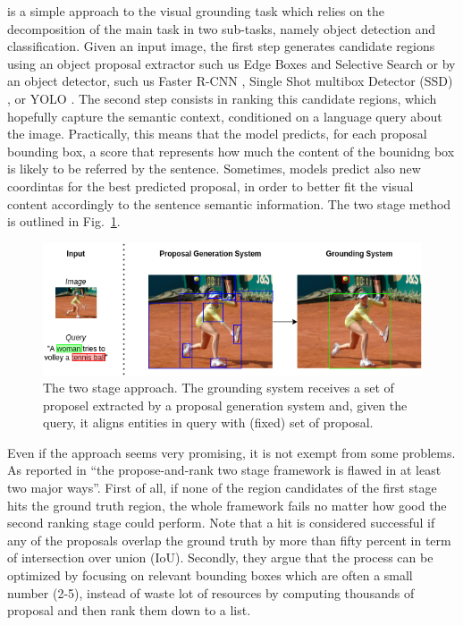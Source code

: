  is a simple approach to the visual
grounding task which relies on the decomposition of the main task in
two sub-tasks, namely object detection and classification. Given an
input image, the first step generates candidate regions using an
object proposal extractor such us Edge Boxes \cite{zitnick2014edge}
and Selective Search \cite{uijlings2013selective} or by an object
detector, such us Faster R-CNN \cite{girshick2014rich}, Single Shot
multibox Detector (SSD) \cite{liu2016ssd}, or YOLO
\cite{redmon2016you}. The second step consists in ranking this
candidate regions, which hopefully capture the semantic context,
conditioned on a language query about the image. Practically, this
means that the model predicts, for each proposal bounding box, a score
that represents how much the content of the bounidng box is likely to
be referred by the sentence. Sometimes, models predict also new
coordintas for the best predicted proposal, in order to better fit the
visual content accordingly to the sentence semantic information. The
two stage method is outlined in Fig.~\ref{fig:two-stage-approach}.

\begin{figure}
  \centering
  \includegraphics[width=.8\textwidth]{figures/two-stage-approach.png}
  \caption[Two stage approach]{
    The two stage approach. The grounding system receives a set of
    proposel extracted by a proposal generation system and, given the
    query, it aligns entities in query with (fixed) set of proposal.
  }
  \label{fig:two-stage-approach}
\end{figure}

Even if the approach seems very promising, it is not exempt from some
problems. As reported in \cite{yang2019fast} ``the propose-and-rank
two stage framework is flawed in at least two major ways''. First of
all, if none of the region candidates of the first stage hits the
ground truth region, the whole framework fails no matter how good the
second ranking stage could perform. Note that a hit is considered
successful if any of the proposals overlap the ground truth by more
than fifty percent in term of intersection over union (IoU). Secondly,
they argue that the process can be optimized by focusing on relevant
bounding boxes which are often a small number (2-5), instead of waste
lot of resources by computing thousands of proposal and then rank them
down to a list.

